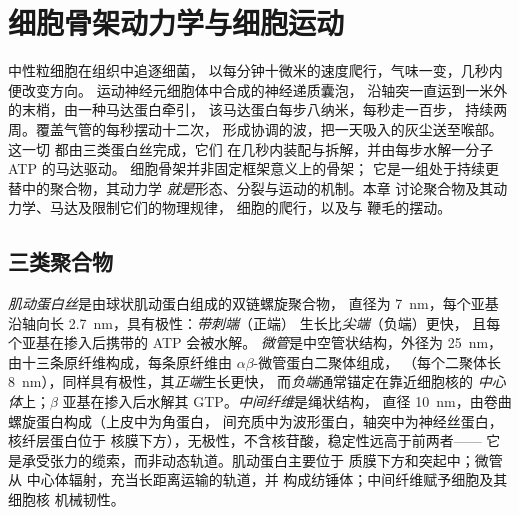 \chapter{细胞骨架动力学与细胞运动}\label{ch:b3:cytoskeleton-motility}

中性粒细胞在组织中追逐细菌，
以每分钟十微米的速度爬行，气味一变，几秒内便改变方向。
运动神经元细胞体中合成的神经递质囊泡，
沿轴突一直运到一米外的末梢，由一种马达蛋白牵引，
该马达蛋白每步八纳米，每秒走一百步，
持续两周。覆盖气管的每秒摆动十二次，
形成协调的波，把一天吸入的灰尘送至喉部。这一切
都由三类蛋白丝完成，它们
在几秒内装配与拆解，并由每步水解一分子 ATP 的马达驱动。
细胞骨架并非固定框架意义上的骨架；
它是一组处于持续更替中的聚合物，其动力学
\emph{就是}形态、分裂与运动的机制。本章
讨论聚合物及其动力学、马达及限制它们的物理规律，
细胞的爬行，以及与
鞭毛的摆动。

\section{三类聚合物}

\begin{definition}\label{def:b3:cytoskeleton-motility:filaments}
\emph{肌动蛋白丝}是由球状肌动蛋白组成的双链螺旋聚合物，
直径为 \qty{7}{nm}，每个亚基沿轴向长 \qty{2.7}{nm}，具有极性：\emph{带刺端}（正端）
生长比\emph{尖端}（负端）更快，
且每个亚基在掺入后携带的 ATP 会被水解。
\emph{微管}是中空管状结构，外径为 \qty{25}{nm}，
由十三条原纤维构成，每条原纤维由 $\alpha\beta$-微管蛋白二聚体组成，
（每个二聚体长 \qty{8}{nm}），同样具有极性，其\emph{正端}生长更快，
而\emph{负端}通常锚定在靠近细胞核的
\emph{中心体}上；$\beta$ 亚基在掺入后水解其
GTP。\emph{中间纤维}是绳状结构，
直径 \qty{10}{nm}，由卷曲螺旋蛋白构成（上皮中为角蛋白，
间充质中为波形蛋白，轴突中为神经丝蛋白，核纤层蛋白位于
核膜下方），无极性，不含核苷酸，稳定性远高于前两者——
它是承受张力的缆索，而非动态轨道。肌动蛋白主要位于
质膜下方和突起中；微管从
中心体辐射，充当长距离运输的轨道，并
构成纺锤体；中间纤维赋予细胞及其细胞核
机械韧性。
\end{definition}

